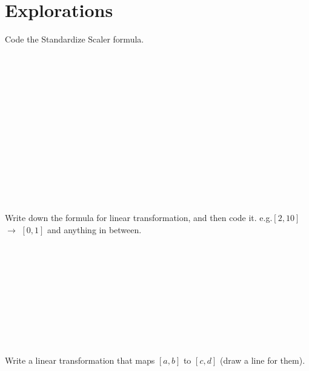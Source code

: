 \section{Explorations}
\begin{outline}
    \1  Code the Standardize Scaler formula. \\
    \\
    \\
    \\
    \\
    \\
    \\
    \\
    \\
    \\
    \\
    \\
    \\
    \\
    \\
    \1  Write down the formula for linear transformation, and then code it. e.g.$[2,10]$ $\rightarrow$ $[0,1]$ and anything in between.\\
    \\
    \\
    \\
    \\
    \\
    \\
    \\
    \\
    \\
    \\
    \1 Write a linear transformation that maps $[a,b]$ to $[c,d]$ (draw a line for them). \\
    

\end{outline}